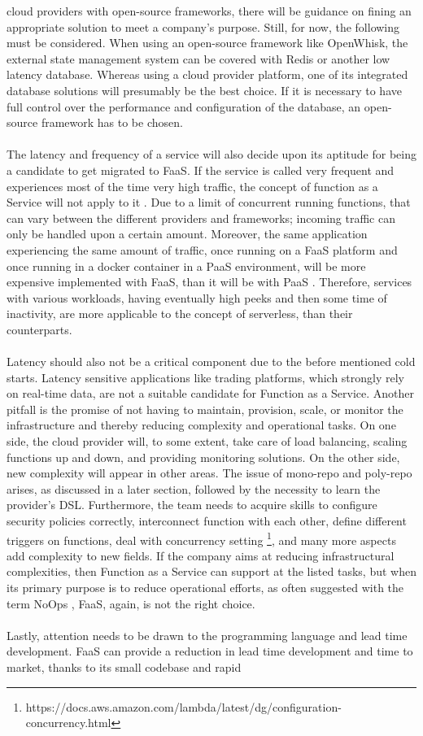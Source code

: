 \documentclass[11pt]{article}
\begin{document}
cloud providers with open-source frameworks, there will be guidance on fining an appropriate solution to meet a company's purpose. Still, for now, the following must be considered. When using an open-source framework like OpenWhisk, the external state management system can be covered with Redis or another low latency database. Whereas using a cloud provider platform, one of its integrated database solutions will presumably be the best choice. If it is necessary to have full control over the performance and configuration of the database, an open-source framework has to be chosen.\\\\ The latency and frequency of a service will also decide upon its aptitude for being a candidate to get migrated to FaaS. If the service is called very frequent and experiences most of the time very high traffic, the concept of function as a Service will not apply to it \cite{jonas2019cloud}. Due to a limit of concurrent running functions, that can vary between the different providers and frameworks; incoming traffic can only be handled upon a certain amount. Moreover, the same application experiencing the same amount of traffic, once running on a FaaS platform and once running in a docker container in a PaaS environment, will be more expensive implemented with FaaS, than it will be with PaaS \cite{jonas2019cloud}. Therefore, services with various workloads, having eventually high peeks and then some time of inactivity, are more applicable to the concept of serverless, than their counterparts.\\\\ Latency should also not be a critical component due to the before mentioned cold starts. Latency sensitive applications like trading platforms, which strongly rely on real-time data, are not a suitable candidate for Function as a Service. Another pitfall is the promise of not having to maintain, provision, scale, or monitor the infrastructure and thereby reducing complexity and operational tasks. On one side, the cloud provider will, to some extent, take care of load balancing, scaling functions up and down, and providing monitoring solutions. On the other side, new complexity will appear in other areas. The issue of mono-repo and poly-repo arises, as discussed in a later section, followed by the necessity to learn the provider's DSL. Furthermore, the team needs to acquire skills to configure security policies correctly, interconnect function with each other, define different triggers on functions, deal with concurrency setting \footnote{https://docs.aws.amazon.com/lambda/latest/dg/configuration-concurrency.html}, and many more aspects add complexity to new fields. If the company aims at reducing infrastructural complexities, then Function as a Service can support at the listed tasks, but when its primary purpose is to reduce operational efforts, as often suggested with the term \glqq NoOps\grqq{} \cite{eivy2017wary}, FaaS, again, is not the right choice.\\\\ Lastly, attention needs to be drawn to the programming language and lead time development. FaaS can provide a reduction in lead time development and time to market, thanks to its small codebase and rapid 
\end{document}
